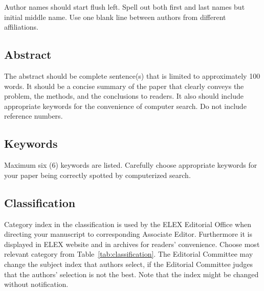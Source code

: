\documentclass{elex}
\begin{document}
Author names should start flush left.  Spell out both first and last names but initial middle name. Use one blank line between authors from different affiliations.


\subsection{Abstract}

The abstract should be complete sentence(s) that is limited to approximately 100 words.  It should be a concise summary of the paper that clearly conveys the problem, the methods, and the conclusions to readers.  It also should include appropriate keywords for the convenience of computer search.  Do not include reference numbers.

\subsection{Keywords}

Maximum six (6) keywords are listed.  Carefully choose appropriate keywords for your paper being correctly spotted by computerized search.


\subsection{Classification}

Category index in the classification is used by the ELEX Editorial Office when directing your manuscript to corresponding Associate Editor. Furthermore it is displayed in ELEX website and in archives for readers' convenience. Choose most relevant category from Table~\ref{tab:classification}. The Editorial Committee may change the subject index that authors select, if the Editorial Committee judges that the authors' selection is not the best.  Note that the index might be changed without notification. 
\end{document}
